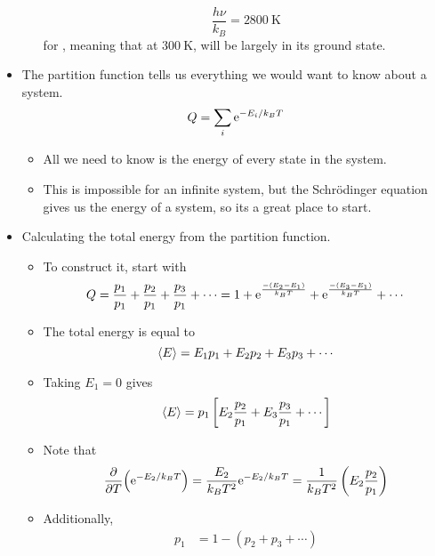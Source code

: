 \documentclass[../notes.tex]{subfiles}
\begin{document}
\begin{itemize}
\begin{itemize}
\begin{equation*}
            \frac{h\nu}{k_B} = \SI{2800}{\kelvin}
        \end{equation*}
        for , meaning that at $\SI{300}{\kelvin}$,  will be largely in its ground state.
    \end{itemize}
    \item The partition function tells us everything we would want to know about a system.
    \begin{equation*}
        Q = \sum_i\e[-E_i/k_BT]
    \end{equation*}
    \begin{itemize}
        \item All we need to know is the energy of every state in the system.
        \item This is impossible for an infinite system, but the Schr\"{o}dinger equation gives us the energy of a system, so its a great place to start.
    \end{itemize}
    \item Calculating the total energy from the partition function.
    \begin{itemize}
        \item To construct it, start with
        \begin{equation*}
            Q = \frac{p_1}{p_1}+\frac{p_2}{p_1}+\frac{p_3}{p_1}+\cdots
            = 1+\e[\frac{-(E_2-E_1)}{k_BT}]+\e[\frac{-(E_3-E_1)}{k_BT}]+\cdots
        \end{equation*}
        \item The total energy is equal to
        \begin{equation*}
            \prb{E} = E_1p_1+E_2p_2+E_3p_3+\cdots
        \end{equation*}
        \item Taking $E_1=0$ gives
        \begin{equation*}
            \prb{E} = p_1\left[ E_2\frac{p_2}{p_1}+E_3\frac{p_3}{p_1}+\cdots \right]
        \end{equation*}
        \item Note that
        \begin{equation*}
            \pdv{T}(\e[-E_2/k_BT]) = \frac{E_2}{k_BT^2}\e[-E_2/k_BT]
            = \frac{1}{k_BT^2}\left( E_2\frac{p_2}{p_1} \right)
        \end{equation*}
        \item Additionally,
        \begin{align*}
            p_1 &= 1-(p_2+p_3+\cdots)\\

\end{align*}
\end{itemize}
\end{itemize}
\end{document}
